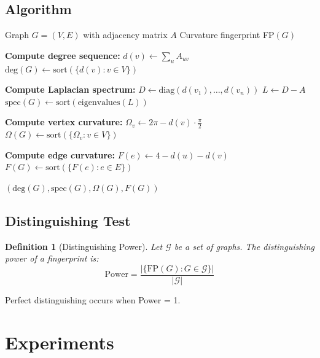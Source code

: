 \documentclass[12pt,a4paper]{article}
\newtheorem{definition}[theorem]{Definition}
\begin{document}
\subsection{Algorithm}

\begin{algorithm}[h]
\caption{Compute Curvature Fingerprint}
\label{alg:fingerprint}
\begin{algorithmic}[1]
\Require Graph $G = (V,E)$ with adjacency matrix $A$
\Ensure Curvature fingerprint FP$(G)$

\State \textbf{Compute degree sequence:}
  \State $d(v) \gets \sum_{u} A_{uv}$
\EndFor
\State $\text{deg}(G) \gets \text{sort}(\{d(v) : v \in V\})$

\State \textbf{Compute Laplacian spectrum:}
\State $D \gets \text{diag}(d(v_1), \ldots, d(v_n))$
\State $L \gets D - A$
\State $\text{spec}(G) \gets \text{sort}(\text{eigenvalues}(L))$

\State \textbf{Compute vertex curvature:}
  \State $\Omega_v \gets 2\pi - d(v) \cdot \frac{\pi}{2}$
\EndFor
\State $\Omega(G) \gets \text{sort}(\{\Omega_v : v \in V\})$

\State \textbf{Compute edge curvature:}
  \State $F(e) \gets 4 - d(u) - d(v)$
\EndFor
\State $F(G) \gets \text{sort}(\{F(e) : e \in E\})$

\State \Return $(\text{deg}(G), \text{spec}(G), \Omega(G), F(G))$
\end{algorithmic}
\end{algorithm}

\subsection{Distinguishing Test}

\begin{definition}[Distinguishing Power]
Let $\mathcal{G}$ be a set of graphs. The \textit{distinguishing power} of a fingerprint is:
$$\text{Power} = \frac{|\{\text{FP}(G) : G \in \mathcal{G}\}|}{|\mathcal{G}|}$$
\end{definition}

Perfect distinguishing occurs when Power = 1.

\section{Experiments}
\end{document}

